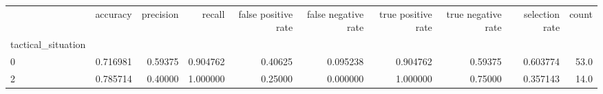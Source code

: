 \begin{tabular}{lrrrrrrrrr}
\toprule
{} &  accuracy &  precision &    recall &  false positive rate &  false negative rate &  true positive rate &  true negative rate &  selection rate &  count \\
tactical\_situation &           &            &           &                      &                      &                     &                     &                 &        \\
\midrule
0                  &  0.716981 &    0.59375 &  0.904762 &              0.40625 &             0.095238 &            0.904762 &             0.59375 &        0.603774 &   53.0 \\
2                  &  0.785714 &    0.40000 &  1.000000 &              0.25000 &             0.000000 &            1.000000 &             0.75000 &        0.357143 &   14.0 \\
\bottomrule
\end{tabular}
